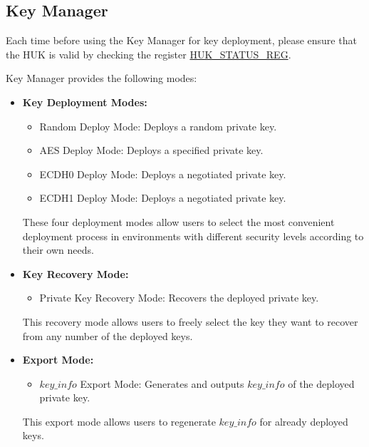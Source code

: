 \documentclass[main\_\_EN.tex]{subfiles}
\begin{document}
\subsection{Key Manager}
\label{sec:key-manager}
\begin{tiplisting}
Each time before using the Key Manager for key deployment, please ensure that the HUK is valid by checking the register \hyperref[regdesc:HUKSTATUSREG]{HUK\_STATUS\_REG}.
\end{tiplisting}

Key Manager provides the following modes:
\begin{itemize}
    \item \textbf{Key Deployment Modes:}
    \begin{itemize}
        \item Random Deploy Mode: Deploys a random private key.
        \item AES Deploy Mode: Deploys a specified private key.
        \item ECDH0 Deploy Mode: Deploys a negotiated private key.
        \item ECDH1 Deploy Mode: Deploys a negotiated private key.
    \end{itemize}
    These four deployment modes allow users to select the most convenient deployment process in environments with different security levels according to their own needs. 
    \item \textbf{Key Recovery Mode:}
        \begin{itemize}
            \item Private Key Recovery Mode: Recovers the deployed private key.
        \end{itemize}
    This recovery mode allows users to freely select the key they want to recover from any number of the deployed keys.
    \item \textbf{Export Mode:}
    \begin{itemize}
        \item \hyperref[para:keyinfo]{\begin{math}key\_info\end{math}} Export Mode: Generates and outputs \hyperref[para:keyinfo]{\begin{math}key\_info\end{math}} of the deployed private key.
    \end{itemize}
    This export mode allows users to regenerate \hyperref[para:keyinfo]{\begin{math}key\_info\end{math}} for already deployed keys.
\end{itemize}
\end{document}
